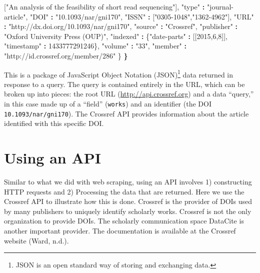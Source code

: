 \documentclass[]{krantz}
\newenvironment{Shaded}{\begin{snugshade}}{\end{snugshade}}
\newcommand{\DecValTok}[1]{\textcolor[rgb]{0.00,0.00,0.81}{#1}}
\newcommand{\StringTok}[1]{\textcolor[rgb]{0.31,0.60,0.02}{#1}}
\newcommand{\OperatorTok}[1]{\textcolor[rgb]{0.81,0.36,0.00}{\textbf{#1}}}
\newcommand{\ErrorTok}[1]{\textcolor[rgb]{0.64,0.00,0.00}{\textbf{#1}}}
\newcommand{\NormalTok}[1]{#1}
\begin{document}
\begin{Shaded}
\begin{Highlighting}[]
\StringTok{       }\NormalTok{[}\StringTok{"An analysis of the feasibility of short read sequencing"}\NormalTok{],}
     \StringTok{"type"} \OperatorTok{:}\StringTok{ "journal-article"}\NormalTok{,}
     \StringTok{"DOI"} \OperatorTok{:}\StringTok{ "10.1093/nar/gni170"}\NormalTok{,}
     \StringTok{"ISSN"} \OperatorTok{:}\StringTok{ }\NormalTok{[}\StringTok{"0305-1048"}\NormalTok{,}\StringTok{"1362-4962"}\NormalTok{],}
     \StringTok{"URL"} \OperatorTok{:}\StringTok{ "http://dx.doi.org/10.1093/nar/gni170"}\NormalTok{,}
     \StringTok{"source"} \OperatorTok{:}\StringTok{ "Crossref"}\NormalTok{,}
     \StringTok{"publisher"} \OperatorTok{:}\StringTok{ "Oxford University Press (OUP)"}\NormalTok{,}
     \StringTok{"indexed"} \OperatorTok{:}\StringTok{ }\NormalTok{\{}\StringTok{"date-parts"} \OperatorTok{:}\StringTok{ }\NormalTok{[[}\DecValTok{2015}\NormalTok{,}\DecValTok{6}\NormalTok{,}\DecValTok{8}\NormalTok{]],}
                  \StringTok{"timestamp"} \OperatorTok{:}\StringTok{ }\DecValTok{1433777291246}\NormalTok{\},}
     \StringTok{"volume"} \OperatorTok{:}\StringTok{ "33"}\NormalTok{,}
     \StringTok{"member"} \OperatorTok{:}\StringTok{ "http://id.crossref.org/member/286"}
\NormalTok{   \}}
\ErrorTok{\}}
\end{Highlighting}
\end{Shaded}

This is a package of JavaScript Object Notation (JSON)\footnote{JSON is
  an open standard way of storing and exchanging data.} data returned in
response to a query. The query is contained entirely in the URL, which
can be broken up into pieces: the root URL
(\url{http://api.crossref.org}) and a data ``query,'' in this case made
up of a ``field'' (\texttt{works}) and an identifier (the DOI
\texttt{10.1093/nar/gni170}). The Crossref API provides information
about the article identified with this specific DOI.

\section{Using an API}\label{sec:4-4}

Similar to what we did with web scraping, using an API involves 1)
constructing HTTP requests and 2) Processing the data that are returned.
Here we use the Crossref API to illustrate how this is done. Crossref is
the provider of DOIs used by many publishers to uniquely identify
scholarly works. Crossref is not the only organization to provide DOIs.
The scholarly communication space DataCite is another important
provider. The documentation is available at the Crossref website (Ward,
n.d.).
\end{document}
